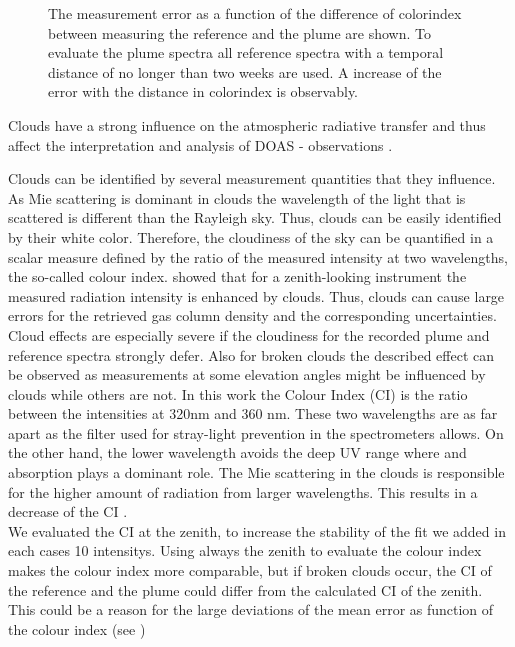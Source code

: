 \documentclass  [
  paper    = a4,
  BCOR     = 10mm,
  twoside,
  fontsize = 12pt,
  fleqn,
  toc      = bibnumbered,
  toc      = listofnumbered,
  numbers  = noendperiod,
  headings = normal,
  listof   = leveldown,
  version  = 3.03
]                                       {scrreprt}
\begin{document}
\begin{figure}
		\caption{The   measurement error as a function of the difference of colorindex between measuring the reference and the plume are shown. To evaluate the plume spectra all reference spectra with a temporal distance of no longer than two weeks are used. A increase of the  error with the distance in colorindex is observably.}
		\label{fig:diffcolidx}
	\end{figure}

	Clouds  have  a  strong  influence  on  the  atmospheric  radiative  transfer  and  thus  affect  the  interpretation  and  analysis of DOAS - observations \citep{wagner2014cloud}.
	
	Clouds can be identified by several measurement quantities that they influence.
	As Mie scattering is dominant in clouds the wavelength of the light that is scattered is different than the Rayleigh sky. Thus, clouds can be easily identified by their white color.
	Therefore, the cloudiness of the sky can be quantified in a scalar measure defined by the ratio of the measured intensity at two wavelengths, the so-called colour index.
	\cite{wagner2014cloud} showed that for a zenith-looking instrument the measured radiation intensity is enhanced by clouds. Thus, clouds can cause large errors for the retrieved gas column density and the corresponding uncertainties. 
	Cloud effects are especially severe if the cloudiness for the recorded plume and reference spectra strongly defer. Also for broken clouds the described effect can be observed as measurements at some elevation angles might be influenced by clouds while others are not.
	In this work the Colour Index (CI) is the ratio between the intensities at 320nm and 360 nm.
	These two wavelengths are as far apart as the filter used for stray-light prevention in the spectrometers allows.
	On the other hand, the lower wavelength avoids the deep UV range where  and   absorption plays a dominant role.
	The Mie scattering in the clouds is responsible for the higher amount of radiation from larger wavelengths. This results in a decrease of the CI \citep{lubcke2014optical}.
	\\
	We evaluated the CI at the zenith, to increase the stability of the fit we added in each cases 10 intensitys. Using always the zenith to evaluate the colour index makes the colour index more comparable, but if broken clouds occur, the CI of the reference and the plume could differ from the calculated CI of the zenith. This could be a reason for the large deviations of the mean  error as function of the colour index (see )
\end{document}
